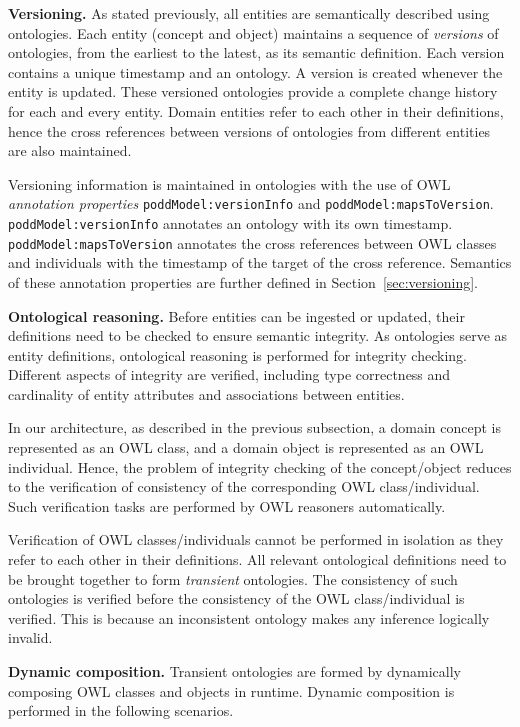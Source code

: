 \documentclass[preprint,12pt]{elsarticle}
\begin{document}
\textbf{Versioning.} As stated previously, all entities are semantically described using ontologies. Each entity (concept and object) maintains a sequence of \emph{versions} of ontologies, from the earliest to the latest, as its semantic definition. Each version contains a unique timestamp and an ontology. A version is created whenever the entity is updated. These versioned ontologies provide a complete change history for each and every entity.
Domain entities refer to each other in their definitions, hence the cross references between versions of ontologies from different entities are also maintained. 

Versioning information is maintained in ontologies with the use of OWL \emph{annotation properties} \texttt{poddModel:versionInfo} and \texttt{poddModel:mapsToVersion}. \texttt{poddModel:versionInfo} annotates an ontology with its own timestamp. \texttt{poddModel:mapsToVersion} annotates the cross references between OWL classes and individuals with the timestamp of the target of the cross reference. Semantics of these annotation properties are further defined in Section~\ref{sec:versioning}.

\textbf{Ontological reasoning.} Before entities can be ingested or updated, their definitions need to be checked to ensure semantic integrity. As ontologies serve as entity definitions, ontological reasoning is performed for integrity checking. Different aspects of integrity are verified, including type correctness and cardinality of entity attributes and associations between entities.

In our architecture, as described in the previous subsection, a domain concept is represented as an OWL class, and a domain object is represented as an OWL individual. Hence, the problem of integrity checking of the concept/object reduces to the verification of consistency of the corresponding OWL class/individual. Such verification tasks are performed by OWL reasoners automatically.

Verification of OWL classes/individuals cannot be performed in isolation as they refer to each other in their definitions. All relevant ontological definitions need to be brought together to form \emph{transient} ontologies. The consistency of such ontologies is verified before the consistency of the OWL class/individual is verified. This is because an inconsistent ontology makes any inference logically invalid. 

\textbf{Dynamic composition.} Transient ontologies are formed by dynamically composing OWL classes and objects in runtime. Dynamic composition is performed in the following scenarios.
\end{document}
